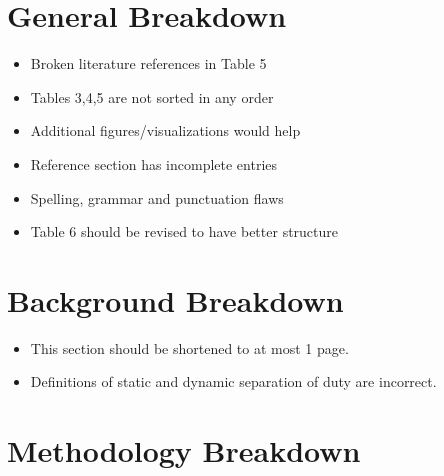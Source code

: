 \pagebreak

\section{General Breakdown}

\begin{itemize}

\item Broken literature references in Table 5

\item Tables 3,4,5 are not sorted in any order

\item Additional figures/visualizations would help

\item Reference section has incomplete entries

\item Spelling, grammar and punctuation flaws

\item Table 6 should be revised to have better structure

\end{itemize}


\section{Background Breakdown}

\begin{itemize}

\item This section should be shortened to at most 1 page.

\item Definitions of static and dynamic separation of duty are incorrect.

\end{itemize}

\section{Methodology Breakdown}

